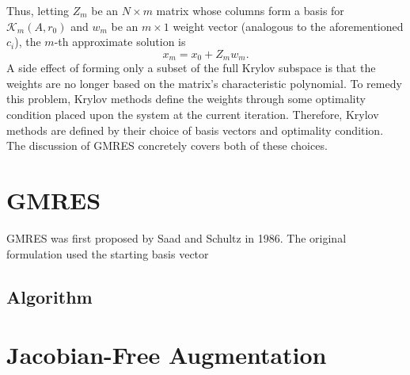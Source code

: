 \documentclass[Prelim,12pt]{WisconsinThesis}
\newcommand{\by}    {\!\times\!}
\begin{document}
Thus, letting $Z_m$ be an $N \by m$ matrix whose columns form a basis for $\mathcal{K}_m(A,r_0)$ and $w_m$ be an $m \by 1$ weight vector (analogous to the aforementioned $c_i$), the $m$-th approximate solution is
\begin{equation}
    x_m = x_0 + Z_m w_m.
    \label{Eqn:ApproximateKrylovSolution}
\end{equation}
A side effect of forming only a subset of the full Krylov subspace is that the weights are no longer based on the matrix's characteristic polynomial.
To remedy this problem, Krylov methods define the weights through some optimality condition placed upon the system at the current iteration.
Therefore, Krylov methods are defined by their choice of basis vectors and optimality condition.
The discussion of GMRES concretely covers both of these choices.



\section{GMRES}
GMRES was first proposed by Saad and Schultz in 1986.
The original formulation used the starting basis vector $ $


\subsection{Algorithm}


\section{Jacobian-Free Augmentation}
\end{document}
